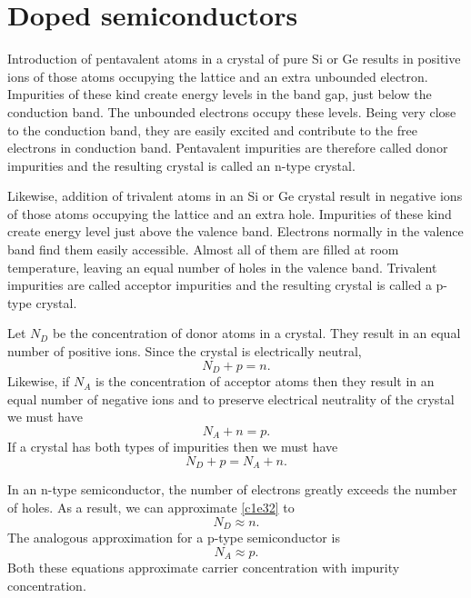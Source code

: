 \section{Doped semiconductors}\label{c1s4}
Introduction of pentavalent atoms in a crystal of pure Si or Ge results in
positive ions of those atoms occupying the lattice and an extra unbounded 
electron. Impurities of these kind create energy levels in the band gap, just
below the conduction band. The unbounded electrons occupy these levels. Being
very close to the conduction band, they are easily excited and contribute to
the free electrons in conduction band. Pentavalent impurities are therefore
called donor impurities and the resulting crystal is called an n-type crystal.

Likewise, addition of trivalent atoms in an Si or Ge crystal result in negative
ions of those atoms occupying the lattice and an extra hole. Impurities of these
kind create energy level just above the valence band. Electrons normally in the
valence band find them easily accessible. Almost all of them are filled at room
temperature, leaving an equal number of holes in the valence band. Trivalent
impurities are called acceptor impurities and the resulting crystal is called
a p-type crystal.

Let $N_D$ be the concentration of donor atoms in a crystal. They result in an
equal number of positive ions. Since the crystal is electrically neutral,
\begin{equation}\label{c1e32}
N_D + p = n.
\end{equation}
Likewise, if $N_A$ is the concentration of acceptor atoms then they result in
an equal number of negative ions and to preserve electrical neutrality of the
crystal we must have
\begin{equation}\label{c1e33}
N_A + n = p.
\end{equation}
If a crystal has both types of impurities then we must have
\begin{equation}\label{c1e34}
N_D + p = N_A + n.
\end{equation}

In an n-type semiconductor, the number of electrons greatly exceeds the number
of holes. As a result, we can approximate \eqref{c1e32} to
\begin{equation}\label{c1e35}
N_D \approx n.
\end{equation}
The analogous approximation for a p-type semiconductor is
\begin{equation}\label{c1e36}
N_A \approx p.
\end{equation}
Both these equations approximate carrier concentration with impurity 
concentration.

